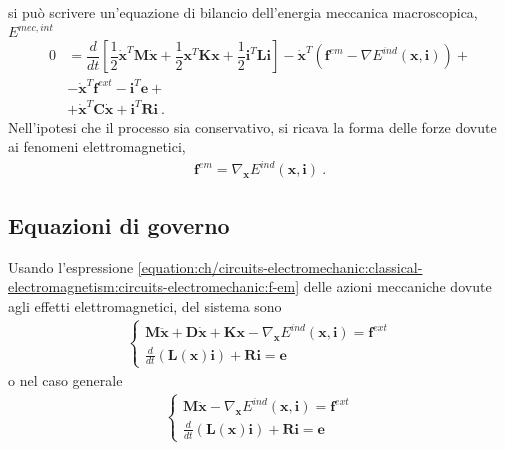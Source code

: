 \documentclass[letterpaper,10pt,italian]{jupyterBook}
\begin{document}
\sphinxAtStartPar
si può scrivere un’equazione di bilancio dell’energia meccanica macroscopica, \(E^{mec, int}\)
\begin{equation*}
\begin{split}
0 & = \dfrac{d}{dt} \left[ \dfrac{1}{2} \dot{\mathbf{x}}^T \mathbf{M} \dot{\mathbf{x}} + \dfrac{1}{2} \mathbf{x}^T \mathbf{K} \mathbf{x} + \dfrac{1}{2} \mathbf{i}^T \mathbf{L} \mathbf{i} \right] - \dot{\mathbf{x}}^T \left( \mathbf{f}^{em} - \nabla E^{ind}(\mathbf{x}, \mathbf{i})  \right) + \\
  & - \dot{\mathbf{x}}^T \mathbf{f}^{ext} - \mathbf{i}^T \mathbf{e} + \\
  & + \dot{\mathbf{x}}^T \mathbf{C} \dot{\mathbf{x}} + \mathbf{i}^T \mathbf{R} \mathbf{i} \ .
\end{split}
\end{equation*}
\sphinxAtStartPar
Nell’ipotesi che il processo sia conservativo, si ricava la forma delle forze dovute ai fenomeni elettromagnetici,
\begin{equation}\label{equation:ch/circuits-electromechanic:classical-electromagnetism:circuits-electromechanic:f-em}
\begin{split}\mathbf{f}^{em} = \nabla_{\mathbf{x}} E^{ind}(\mathbf{x}, \mathbf{i}) \ .\end{split}
\end{equation}

\subsection{Equazioni di governo}
\label{\detokenize{ch/circuits-electromechanic:equazioni-di-governo}}
\sphinxAtStartPar
Usando l’espressione \eqref{equation:ch/circuits-electromechanic:classical-electromagnetism:circuits-electromechanic:f-em} delle azioni meccaniche dovute agli effetti elettromagnetici, del sistema sono
\begin{equation*}
\begin{split}\begin{cases}
  \mathbf{M} \ddot{\mathbf{x}} + \mathbf{D} \dot{\mathbf{x}} + \mathbf{K} \mathbf{x} - \nabla_{\mathbf{x}} E^{ind}(\mathbf{x}, \mathbf{i})  = \mathbf{f}^{ext} \\
  \frac{d}{dt} \left( \mathbf{L}(\mathbf{x}) \mathbf{i} \right) + \mathbf{R} \mathbf{i} = \mathbf{e}
\end{cases}\end{split}
\end{equation*}
\sphinxAtStartPar
o nel caso generale
\begin{equation*}
\begin{split}\begin{cases}
  \mathbf{M} \ddot{\mathbf{x}} - \nabla_{\mathbf{x}} E^{ind} ( \mathbf{x}, \mathbf{i}) = \mathbf{f}^{ext} \\
  \frac{d}{dt} \left( \mathbf{L}(\mathbf{x}) \mathbf{i} \right) + \mathbf{R} \mathbf{i} = \mathbf{e}
\end{cases}\end{split}
\end{equation*}
\end{document}
